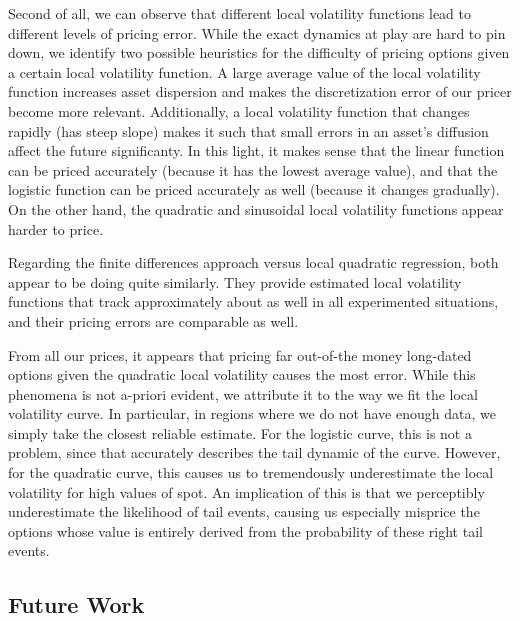 \documentclass[11pt]{article}
\numberwithin{equation}{section}
\begin{document}
Second of all, we can observe that different local volatility functions lead to
different levels of pricing error. While the exact dynamics at play are hard to
pin down, we identify two possible heuristics for the difficulty of pricing
options given a certain local volatility function. A large average value of the
local volatility function increases asset dispersion and makes the
discretization error of our pricer become more relevant. Additionally, a local
volatility function that changes rapidly (has steep slope) makes it such that
small errors in an asset's diffusion affect the future significanty. In this
light, it makes sense that the linear function can be priced accurately (because
it has the lowest average value), and that the logistic function can be priced
accurately as well (because it changes gradually). On the other hand, the
quadratic and sinusoidal local volatility functions appear harder to price.

Regarding the finite differences approach versus local quadratic regression,
both appear to be doing quite similarly. They provide estimated local volatility
functions that track approximately about as well in all experimented situations,
and their pricing errors are comparable as well.

From all our prices, it appears that pricing far out-of-the money long-dated
options given the quadratic local volatility causes the most error. While this
phenomena is not a-priori evident, we attribute it to the way we fit the local
volatility curve. In particular, in regions where we do not have enough data, we
simply take the closest reliable estimate. For the logistic curve, this is not a
problem, since that accurately describes the tail dynamic of the curve. However,
for the quadratic curve, this causes us to tremendously underestimate the local
volatility for high values of spot. An implication of this is that we
perceptibly underestimate the likelihood of tail events, causing us especially
misprice the options whose value is entirely derived from the probability of
these right tail events.


\subsection{Future Work}
\end{document}
